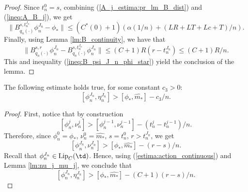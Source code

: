 \documentclass[a4paper,12pt]{article}
\begin{document}
\begin{proof}
	Since $t^0_n=s$, combining (\ref{A_j_estima:pr_lm_B_dist}) and (\ref{ineq:A_B_j}), we get
	\begin{equation}\label{ineq:B_psi_J_n_phi_star}
	\|B^{s,t^{J_n}_n}_{q_n(\cdot)}\phi^{J_n}_n-\phi_*\|\leq (C^*(0)+1)(\alpha(1/n)+(LR+LT+Lc+T)/n).
	\end{equation} 
	Finally, using Lemma \ref{lm:B_continuity},  we have that 
	$$\|B^{s,r}_{q_n(\cdot)}\phi^{J_n}_n-B^{s,t^{J_n}_n}_{q_n(\cdot)}\phi^{J_n}_n\|\leq (C+1)R(r-t^{J_n}_n)\leq (C+1)R/n. $$
	This and inequality (\ref{ineq:B_psi_J_n_phi_star}) yield the conclusion of the lemma.
\end{proof}

\begin{lemma}\label{lm:action_n}
	The following estimate holds true, for some constant $c_3>0$:
	$$[\phi_n^{J_n},\eta_n^{J_n}]>[\phi_*,\widehat{m_*}]-c_3/n. $$
\end{lemma}
\begin{proof}
	First, notice that by construction
	$$[\phi^j_n,\nu_n^j]>[\phi^{j-1}_n,\nu_n^{j-1}]-(t_n^{j}-t_n^{j-1})/n. $$ Therefore, since $\phi^0_n=\phi_*$, $\nu^0_n=\widehat{m_*}$, $s=t_n^0$, $r>t^{J_n}_n$, we get
	$$[\phi^{J_n}_n,\nu_n^{J_n}]>[\phi_*,\widehat{m_*}]-(r-s)/n. $$
	Recall that $\phi^{J_n}_n\in\mathrm{Lip}_C(\td)$. Hence, using (\ref{estima:action_continuous}) and Lemma \ref{lm:nu_j_mu_j}, we conclude that
	$$[\phi_n^{J_n},\eta_n^{J_n}]>[\phi_*,\widehat{m_*}]-(C+1)(r-s)/n. $$
\end{proof}
\end{document}
